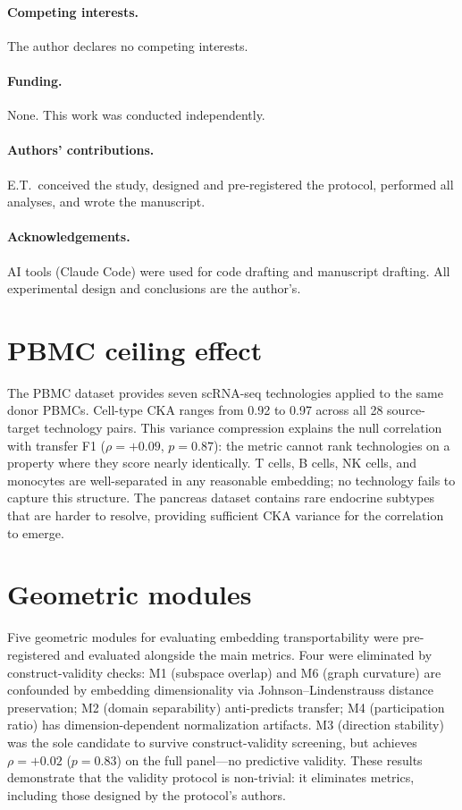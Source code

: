 \documentclass[11pt]{article}
\begin{document}
\paragraph{Competing interests.} The author declares no competing
interests.

\paragraph{Funding.} None. This work was conducted independently.

\paragraph{Authors' contributions.} E.T.\ conceived the study,
designed and pre-registered the protocol, performed all analyses, and
wrote the manuscript.

\paragraph{Acknowledgements.} AI tools (Claude Code) were used for code
drafting and manuscript drafting. All experimental design and conclusions
are the author's.


\appendix

\section{PBMC ceiling effect}
\label{app:pbmc}

The PBMC dataset \citep{ding2020systematic} provides seven scRNA-seq
technologies applied to the same donor PBMCs. Cell-type CKA ranges from
0.92 to 0.97 across all 28 source-target technology pairs. This
variance compression explains the null correlation with transfer F1
($\rho = +0.09$, $p = 0.87$): the metric cannot rank technologies on
a property where they score nearly identically. T cells, B cells, NK
cells, and monocytes are well-separated in any reasonable embedding; no
technology fails to capture this structure. The pancreas dataset contains
rare endocrine subtypes that are harder to resolve, providing sufficient
CKA variance for the correlation to emerge.


\section{Geometric modules}
\label{app:modules}

Five geometric modules for evaluating embedding transportability were
pre-registered and evaluated alongside the main metrics. Four were
eliminated by construct-validity checks: M1 (subspace overlap) and M6
(graph curvature) are confounded by embedding dimensionality via
Johnson--Lindenstrauss distance preservation; M2 (domain separability)
anti-predicts transfer; M4 (participation ratio) has
dimension-dependent normalization artifacts. M3 (direction stability)
was the sole candidate to survive construct-validity screening, but
achieves $\rho = +0.02$ ($p = 0.83$) on the full panel---no
predictive validity. These results demonstrate that the validity
protocol is non-trivial: it eliminates metrics, including those designed
by the protocol's authors.
\end{document}
